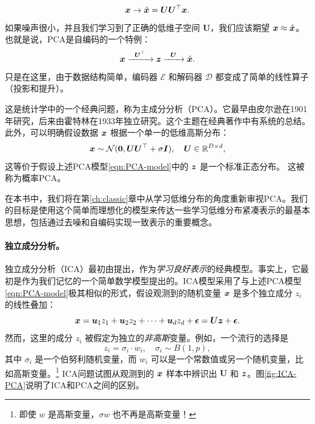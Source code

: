 \documentclass[../../book-main.tex]{subfiles}
\begin{document}
\begin{equation}
\bm{x} \rightarrow \hat {\bm{x}} = \boldsymbol{U}\boldsymbol{U}^\top \bm{x}. 
\end{equation}
如果噪声很小，并且我们学习到了正确的低维子空间 $\boldsymbol{U}$，我们应该期望 $\bm{x} \approx \hat {\bm{x}}$。也就是说，PCA是自编码的一个特例：
\begin{equation}
    \bm{x}   \xrightarrow{\hspace{2mm} \boldsymbol{U}^\top\hspace{2mm}} \bm{z}  \xrightarrow{\hspace{2mm} \boldsymbol{U} \hspace{2mm}} \hat {\bm{x}}.
       \label{eqn:auto-encoding-PCA}
\end{equation}
只是在这里，由于数据结构简单，编码器 $\mathcal{E}$ 和解码器 $\mathcal{D}$ 都变成了简单的线性算子（投影和提升）。

这是统计学中的一个经典问题，称为主成分分析（PCA）。它最早由皮尔逊在1901年研究\cite{Pearson1901}，后来由霍特林在1933年独立研究\cite{Hotelling1933}。这个主题在经典著作\cite{Jolliffe1986,JolliffeI2002}中有系统的总结。
此外，可以明确假设数据 $\bm{x}$ 根据一个单一的低维高斯分布：
\begin{equation}
    \bm{x} \sim \mathcal{N}(\boldsymbol{0}, \boldsymbol{U}\boldsymbol{U}^\top + \sigma \bm{I}), \quad \boldsymbol{U} \in \mathbb{R}^{D\times d},
\end{equation}
这等价于假设上述PCA模型\eqref{eqn:PCA-model}中的 $\bm{z}$ 是一个标准正态分布。
这被称为概率PCA\cite{TippingM1999}。

在本书中，我们将在第\ref{ch:classic}章中从学习低维分布的角度重新审视PCA。我们的目标是使用这个简单而理想化的模型来传达一些学习低维分布紧凑表示的最基本思想，包括通过去噪和自编码实现一致表示的重要概念。

\paragraph{独立成分分析。}
独立成分分析（ICA）最初由\cite{Ans-1985}提出，作为{\em 学习良好表示}的经典模型。事实上，它最初是作为我们记忆的一个简单数学模型提出的。ICA模型采用了与上述PCA模型\eqref{eqn:PCA-model}极其相似的形式，假设观测到的随机变量 $\bm{x}$ 是多个独立成分 $z_i$ 的线性叠加：
\begin{equation}
    \bm{x} = \boldsymbol{u}_1 z_1 + \boldsymbol{u}_2 z_2 + \cdots + \boldsymbol{u}_d z_d  + \boldsymbol{\epsilon} =  \boldsymbol{U} \bm{z} + \boldsymbol{\epsilon}.
    \label{eqn:ICA-model}
\end{equation}
然而，这里的成分 $z_i$ 被假定为独立的{\em 非高斯}变量。例如，一个流行的选择是
\begin{equation}
    z_i = \sigma_i \cdot w_i, \quad \sigma_i \sim B(1,p),
    \label{eqn:ICA-modes}
\end{equation}
其中 $\sigma_i$ 是一个伯努利随机变量，而 $w_i$ 可以是一个常数值或另一个随机变量，比如高斯变量。\footnote{即使 $w$ 是高斯变量，$\sigma w$ 也不再是高斯变量！} ICA问题试图从观测到的 $\bm{x}$ 样本中辨识出 $\boldsymbol{U}$ 和 $\bm{z}$。图\ref{fig:ICA-PCA}说明了ICA和PCA之间的区别。
\end{document}
